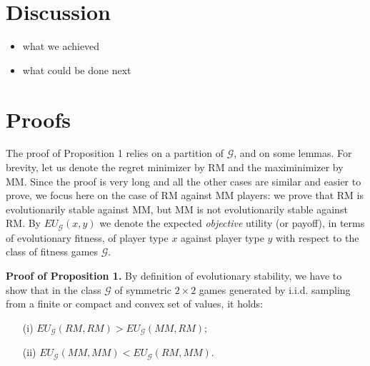 \documentclass[fleqn,reqno,11pt]{article}
\begin{document}
\section{Discussion}

\begin{itemize}
\item what we achieved
\item what could be done next
\end{itemize}




\appendix


\section{Proofs}

The proof of Proposition 1 relies on a partition of $\mathcal{G}$,
and on some lemmas. For brevity, let us denote the regret minimizer
by RM and the maximinimizer by MM. Since the proof is very long and
all the other cases are similar and easier to prove, we focus here
on the case of RM against MM players: we prove that RM is evolutionarily
stable against MM, but MM is not evolutionarily stable against RM. By $EU_{\mathcal{G}}(x,y)$ we denote the expected \textit{objective} utility (or payoff), in terms
of evolutionary fitness, of player type $x$ against player type $y$
with respect to the class of fitness games $\mathcal{G}$. 

\medskip{}


\textbf{Proof of Proposition 1.} By definition of evolutionary stability, we have to
show that in the class $\mathcal{G}$ of symmetric $2\times2$ games generated by i.i.d. sampling
from a finite or compact and convex set of values, it holds:
\begin{itemize}
\item[(i)] $EU_{\mathcal{G}}(RM,RM)>EU_{\mathcal{G}}(MM,RM);$
\item[(ii)] $EU_{\mathcal{G}}(MM,MM)<EU_{\mathcal{G}}(RM,MM).$
\end{itemize}
\end{document}
